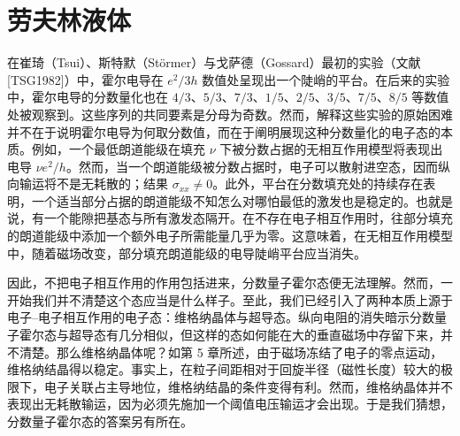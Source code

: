 \section{劳夫林液体}

在崔琦（Tsui）、斯特默（Störmer）与戈萨德（Gossard）最初的实验（文献 [TSG1982]）中，霍尔电导在 $e^{2}/3h$ 数值处呈现出一个陡峭的平台。在后来的实验中，霍尔电导的分数量化也在 $4/3$、$5/3$、$7/3$、$1/5$、$2/5$、$3/5$、$7/5$、$8/5$ 等数值处被观察到。这些序列的共同要素是分母为奇数。然而，解释这些实验的原始困难并不在于说明霍尔电导为何取分数值，而在于阐明展现这种分数量化的电子态的本质。例如，一个最低朗道能级在填充 $\nu$ 下被分数占据的无相互作用模型将表现出电导 $\nu e^{2}/h$。然而，当一个朗道能级被分数占据时，电子可以散射进空态，因而纵向输运将不是无耗散的；结果 $\sigma_{xx}\neq 0$。此外，平台在分数填充处的持续存在表明，一个适当部分占据的朗道能级不知怎么对哪怕最低的激发也是稳定的。也就是说，有一个能隙把基态与所有激发态隔开。在不存在电子相互作用时，往部分填充的朗道能级中添加一个额外电子所需能量几乎为零。这意味着，在无相互作用模型中，随着磁场改变，部分填充朗道能级的电导陡峭平台应当消失。

因此，不把电子相互作用的作用包括进来，分数量子霍尔态便无法理解。然而，一开始我们并不清楚这个态应当是什么样子。至此，我们已经引入了两种本质上源于电子–电子相互作用的电子态：维格纳晶体与超导态。纵向电阻的消失暗示分数量子霍尔态与超导态有几分相似，但这样的态如何能在大的垂直磁场中存留下来，并不清楚。那么维格纳晶体呢？如第 5 章所述，由于磁场冻结了电子的零点运动，维格纳结晶得以稳定。事实上，在粒子间距相对于回旋半径（磁性长度）较大的极限下，电子关联占主导地位，维格纳结晶的条件变得有利。然而，维格纳晶体并不表现出无耗散输运，因为必须先施加一个阈值电压输运才会出现。于是我们猜想，分数量子霍尔态的答案另有所在。

